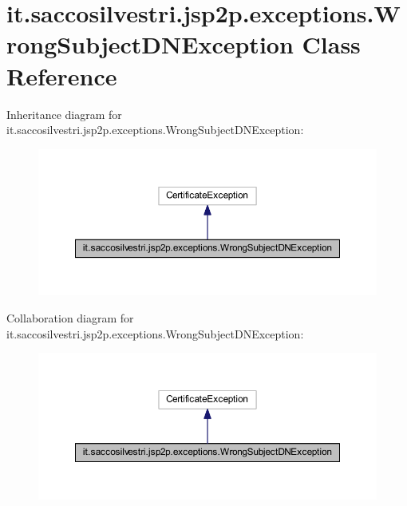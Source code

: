 \hypertarget{classit_1_1saccosilvestri_1_1jsp2p_1_1exceptions_1_1_wrong_subject_d_n_exception}{
\section{it.saccosilvestri.jsp2p.exceptions.\-Wrong\-Subject\-D\-N\-Exception \-Class \-Reference}
\label{classit_1_1saccosilvestri_1_1jsp2p_1_1exceptions_1_1_wrong_subject_d_n_exception}
}


\-Inheritance diagram for it.saccosilvestri.jsp2p.exceptions.\-Wrong\-Subject\-D\-N\-Exception\-:
\nopagebreak
\begin{figure}[H]
\begin{center}
\leavevmode
\includegraphics[width=350pt]{classit_1_1saccosilvestri_1_1jsp2p_1_1exceptions_1_1_wrong_subject_d_n_exception__inherit__graph}
\end{center}
\end{figure}


\-Collaboration diagram for it.saccosilvestri.jsp2p.exceptions.\-Wrong\-Subject\-D\-N\-Exception\-:
\nopagebreak
\begin{figure}[H]
\begin{center}
\leavevmode
\includegraphics[width=350pt]{classit_1_1saccosilvestri_1_1jsp2p_1_1exceptions_1_1_wrong_subject_d_n_exception__coll__graph}
\end{center}
\end{figure}
